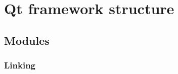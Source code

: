 \section{Qt framework structure}\label{section:qtstructure}

\subsection{Modules}

\subsubsection{Linking}